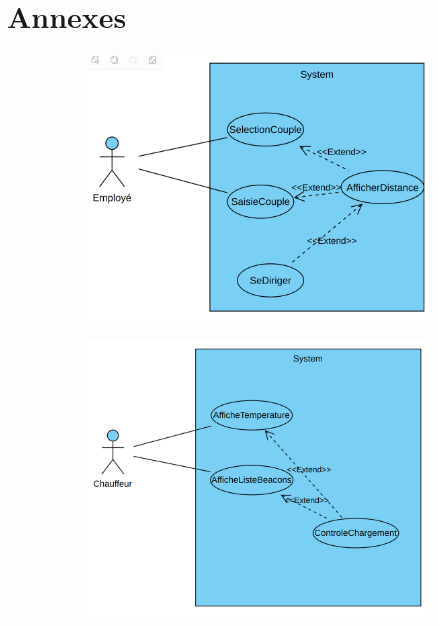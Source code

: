\documentclass[10pt,a4paper]{book}
\begin{document}
\part{Annexes}

\begin{figure}[h!]
    \centering
    \begin{subfigure}[b]{0.45\textwidth}
        \centering
        \includegraphics[scale=0.14]{Images/recherche-actif.png}
        \caption{}
        \label{recherche-actif.png1}
    \end{subfigure}
    \begin{subfigure}[b]{0.45\textwidth}
        \includegraphics[scale=0.14]{Images/controle-chargement.png}
        \caption{}
        \label{controle-chargement.png1}
    \end{subfigure}
    \caption{}
\end{figure}
\end{document}
